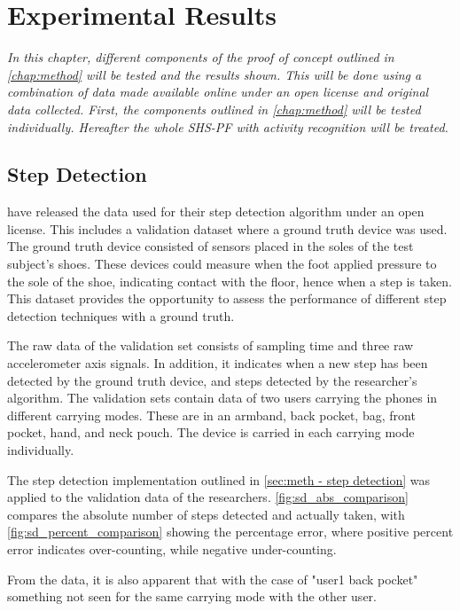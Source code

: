 \chapter{Experimental Results}

\textit{In this chapter, different components of the proof of concept outlined in \cref{chap:method} will be tested and the results shown. This will be done using a combination of data made available online under an open license and original data collected. First, the components outlined in \cref{chap:method} will be tested individually. Hereafter the whole SHS-PF with activity recognition will be treated.}

\section{Step Detection}
\citet{Salvi2018} have released the data used for their step detection algorithm under an open license. This includes a validation dataset where a ground truth device was used. The ground truth device consisted of sensors placed in the soles of the test subject's shoes. These devices could measure when the foot applied pressure to the sole of the shoe, indicating contact with the floor, hence when a step is taken. This dataset provides the opportunity to assess the performance of different step detection techniques with a ground truth.\par

The raw data of the validation set consists of sampling time and three raw accelerometer axis signals. In addition, it indicates when a new step has been detected by the ground truth device, and steps detected by the researcher's algorithm. The validation sets contain data of two users carrying the phones in different carrying modes. These are in an armband, back pocket, bag, front pocket, hand, and neck pouch. The device is carried in each carrying mode individually.\par

The step detection implementation outlined in \cref{sec:meth - step detection} was applied to the validation data of the researchers. \cref{fig:sd_abs_comparison} compares the absolute number of steps detected and actually taken, with \cref{fig:sd_percent_comparison}  showing the percentage error, where positive percent error indicates over-counting, while negative under-counting.  \par 
From the data, it is also apparent that with the case of "user1 back pocket" something not seen for the same carrying mode with the other user. 
 
